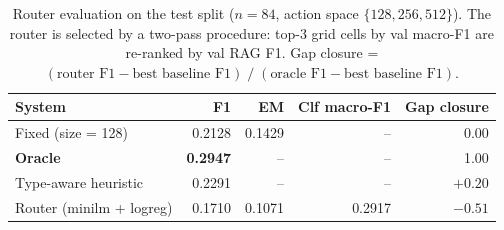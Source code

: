 \begin{table}[t]
\centering
\caption{Router evaluation on the test split ($n=84$, action space $\{128, 256, 512\}$). The router is selected by a two-pass procedure: top-3 grid cells by val macro-F1 are re-ranked by val RAG F1. Gap closure = $(\text{router F1} - \text{best baseline F1})\;/\;(\text{oracle F1} - \text{best baseline F1})$.}
\label{tab:router-results}
\begin{tabular}{lrrrr}
\toprule
System & F1 & EM & Clf macro-F1 & Gap closure \\
\midrule
Fixed (size = 128) & 0.2128 & 0.1429 & -- & 0.00 \\
\textbf{Oracle} & \textbf{0.2947} & -- & -- & 1.00 \\
\midrule
Type-aware heuristic & 0.2291 & -- & -- & $+0.20$ \\
Router (minilm + logreg) & 0.1710 & 0.1071 & 0.2917 & $-0.51$ \\
\bottomrule
\end{tabular}
\end{table}
